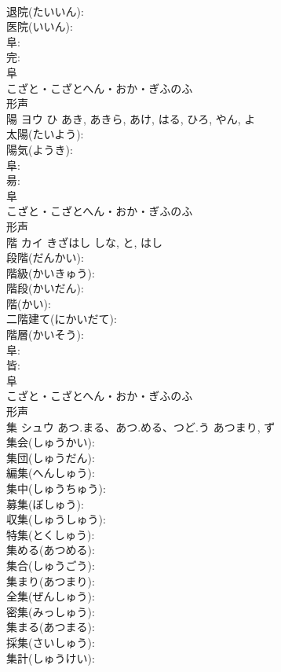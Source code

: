 \documentclass[8pt]{extreport}
\begin{document}
\begin{CJK}{UTF8}{min}
\\	退院(たいいん): 
\\	医院(いいん): 
\\	阜: 
\\	完: 
\\	阜	
\\	こざと・こざとへん・おか・ぎふのふ	
\\	形声 
\\	陽	ヨウ	ひ	あき, あきら, あけ, はる, ひろ, やん, よ	
\\	太陽(たいよう): 
\\	陽気(ようき): 
\\	阜: 
\\	昜: 
\\	阜	
\\	こざと・こざとへん・おか・ぎふのふ	
\\	形声 
\\	階	カイ	きざはし	しな, と, はし	
\\	段階(だんかい): 
\\	階級(かいきゅう): 
\\	階段(かいだん): 
\\	階(かい): 
\\	二階建て(にかいだて): 
\\	階層(かいそう): 
\\	阜: 
\\	皆: 
\\	阜	
\\	こざと・こざとへん・おか・ぎふのふ	
\\	形声 
\\	集	シュウ	あつ.まる、あつ.める、つど.う	あつまり, ず	
\\	集会(しゅうかい): 
\\	集団(しゅうだん): 
\\	編集(へんしゅう): 
\\	集中(しゅうちゅう): 
\\	募集(ぼしゅう): 
\\	収集(しゅうしゅう): 
\\	特集(とくしゅう): 
\\	集める(あつめる): 
\\	集合(しゅうごう): 
\\	集まり(あつまり): 
\\	全集(ぜんしゅう): 
\\	密集(みっしゅう): 
\\	集まる(あつまる): 
\\	採集(さいしゅう): 
\\	集計(しゅうけい): 

\end{CJK}
\end{document}
